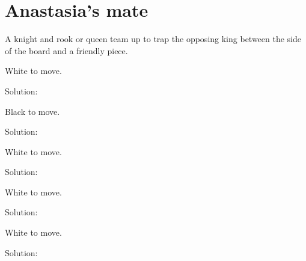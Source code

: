 \documentclass{book}
\begin{document}
\section{Anastasia's mate}
A knight and rook or queen team up to trap the opposing king between the side of the board and a friendly piece.\begin{multicols}{2} 
\begin{samepage} 
\newgame 


 
\showboard
 
 White to move. 
 
Solution: 
 
\end{samepage}\begin{samepage} 
\newgame 


 
\showboard
 
 Black to move. 
 
Solution: 
 
\end{samepage}\begin{samepage} 
\newgame 


 
\showboard
 
 White to move. 
 
Solution: 
 
\end{samepage}\begin{samepage} 
\newgame 


 
\showboard
 
 White to move. 
 
Solution: 
 
\end{samepage}\begin{samepage} 
\newgame 


 
\showboard
 
 White to move. 
 
Solution: 
 
\end{samepage}\end{multicols} 
\newpage 
\end{document}
